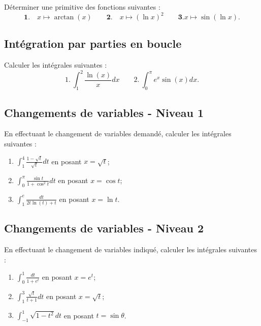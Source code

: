 Déterminer une primitive des fonctions suivantes :
$$\mathbf{1.}\quad x\mapsto\arctan(x)\quad\quad\mathbf{2.}\quad x\mapsto (\ln x)^2\quad\quad\mathbf{3.} x\mapsto \sin(\ln x).$$




\vspace{1em}
\subsection{Intégration par parties en boucle}

Calculer les intégrales suivantes :
$$1.\ \int_1^2 \frac{\ln(x)}{x}dx\quad\quad 2.\ \int_0^\pi e^x\sin(x)dx.$$




\vspace{1em}
\subsection{Changements de variables - Niveau 1}

En effectuant le changement de variables demandé, calculer les intégrales suivantes :
\begin{enumerate}
\item $\displaystyle \int_1^4\frac{1-\sqrt t}{\sqrt t}dt$ en posant $x=\sqrt t$;
\item $\displaystyle \int_0^{\pi}\frac{\sin t}{1+\cos^2 t}dt$ en posant $x=\cos t$;
\item $\displaystyle \int_1^e \frac{dt}{2t\ln (t)+t}$ en posant $x=\ln t$.
\end{enumerate}




\vspace{1em}
\subsection{Changements de variables - Niveau 2}

En effectuant le changement de variables indiqué, calculer les intégrales suivantes :
\begin{enumerate}
\item  $\displaystyle \int_0^1\frac{dt}{1+e^t}$ en posant $x=e^t$;
\item $\displaystyle \int_1^3\frac{\sqrt t}{t+1}dt$ en posant $x=\sqrt t$;
\item $\displaystyle \int_{-1}^1 \sqrt{1-t^2}dt$ en posant $t=\sin\theta$.
\end{enumerate}


